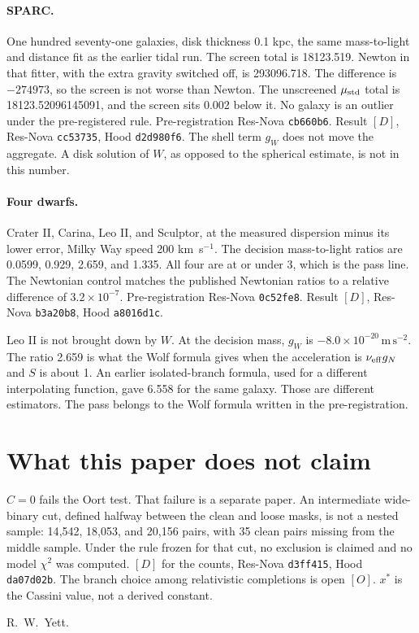 \documentclass[11pt]{article}
\begin{document}
\paragraph{SPARC.}
One hundred seventy-one galaxies, disk thickness 0.1 kpc, the same mass-to-light and distance fit as the earlier tidal run. The screen total is 18123.519. Newton in that fitter, with the extra gravity switched off, is 293096.718. The difference is \(-274973\), so the screen is not worse than Newton. The unscreened \(\mu_{\rm std}\) total is 18123.52096145091, and the screen sits 0.002 below it. No galaxy is an outlier under the pre-registered rule. Pre-registration Res-Nova \texttt{cb660b6}. Result \([D]\), Res-Nova \texttt{cc53735}, Hood \texttt{d2d980f6}. The shell term \(g_W\) does not move the aggregate. A disk solution of \(W\), as opposed to the spherical estimate, is not in this number.

\paragraph{Four dwarfs.}
Crater II, Carina, Leo II, and Sculptor, at the measured dispersion minus its lower error, Milky Way speed 200 km~s\(^{-1}\). The decision mass-to-light ratios are 0.0599, 0.929, 2.659, and 1.335. All four are at or under 3, which is the pass line. The Newtonian control matches the published Newtonian ratios to a relative difference of \(3.2\times 10^{-7}\). Pre-registration Res-Nova \texttt{0c52fe8}. Result \([D]\), Res-Nova \texttt{b3a20b8}, Hood \texttt{a8016d1c}.

Leo II is not brought down by \(W\). At the decision mass, \(g_W\) is \(-8.0\times 10^{-20}\,\mathrm{m\,s^{-2}}\). The ratio 2.659 is what the Wolf formula gives when the acceleration is \(\nu_{\rm eff} g_N\) and \(S\) is about 1. An earlier isolated-branch formula, used for a different interpolating function, gave 6.558 for the same galaxy. Those are different estimators. The pass belongs to the Wolf formula written in the pre-registration.

\section{What this paper does not claim}

\(C = 0\) fails the Oort test. That failure is a separate paper. An intermediate wide-binary cut, defined halfway between the clean and loose masks, is not a nested sample: 14{,}542, 18{,}053, and 20{,}156 pairs, with 35 clean pairs missing from the middle sample. Under the rule frozen for that cut, no exclusion is claimed and no model \(\chi^2\) was computed. \([D]\) for the counts, Res-Nova \texttt{d3ff415}, Hood \texttt{da07d02b}. The branch choice among relativistic completions is open \([O]\). \(x^*\) is the Cassini value, not a derived constant.

\vspace{2em}
\noindent R.~W.~Yett.
\end{document}
